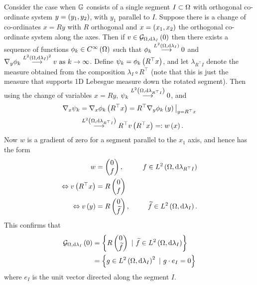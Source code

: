 Consider the case when $\mathbb{G}$ consists of a single segment $I\subset\Omega$ with orthogonal co-ordinate system $y=\left( y_1,y_2 \right)$, with $y_1$ parallel to $I$.
Suppose there is a change of co-ordinates $x=Ry$ with $R$ orthogonal and $x=\left( x_1,x_2 \right)$ the orthogonal co-ordinate system along the axes.
Then if $v\in\mathcal{G}_{ \Omega, \mathrm{d}\lambda_I}\left( 0 \right)$ then there exists a sequence of functions $\phi_k\in C^{\infty}\left( \Omega \right)$ such that $\phi_k\overset{L^{2}\left( \Omega,\mathrm{d}\lambda_I \right)}{\longrightarrow}0$ and $\nabla_y\phi_k\overset{L^{2}\left( \Omega,\mathrm{d}\lambda_I \right)^2}{\longrightarrow} v \ \text{as} \ k \rightarrow\infty$.
Define $\psi_k = \phi_k\left( R^{\top}x \right)$, and let $\lambda_{R^{\top}I}$ denote the measure obtained from the composition $\lambda_I\circ R^{\top}$ (note that this is just the measure that supports 1D Lebesgue measure down the rotated segment).
Then using the change of variables $x=Ry$, $\psi_k\overset{L^{2}\left( \Omega,\mathrm{d}\lambda_{R^{\top}I} \right)}{\longrightarrow}0$, and
\begin{align*}
	\nabla_x\psi_k &= \nabla_x\phi_k\left( R^{\top}x \right) = R^{\top}\nabla_y\phi_k\left( y \right)\big\vert_{y=R^{\top}x} \\
	&\overset{L^{2}\left( \Omega,\mathrm{d}\lambda_{R^{\top}I} \right)}{\longrightarrow} R^{\top}v\left( R^{\top}x \right) =: w\left( x \right).
\end{align*}
Now $w$ is a gradient of zero for a segment parallel to the $x_1$ axis, and hence has the form
\begin{align*}
	w &= \begin{pmatrix} 0 \\ f \end{pmatrix}, &\quad f\in L^{2}\left( \Omega,\mathrm{d}\lambda_{R^{\top}I} \right) \\
	\Leftrightarrow v\left( R^{\top}x \right) &= R\begin{pmatrix} 0 \\ f \end{pmatrix} &\\
	\Leftrightarrow v\left( y \right) &= R\begin{pmatrix} 0 \\ \widetilde{f} \end{pmatrix}, &\quad \widetilde{f}\in L^{2}\left( \Omega,\mathrm{d}\lambda_I \right).
\end{align*}
This confirms that 
\begin{align*}
	\gradZero{\ddom}{\lambda_I} &= \clbracs{R\begin{pmatrix} 0 \\ \widetilde{f} \end{pmatrix} \ \vert \ \widetilde{f}\in\ltwo{\ddom}{\lambda_I}} \\
	&= \clbracs{g\in\ltwo{\ddom}{\lambda_I}^2 \ \vert \ g\cdot e_{I} = 0}
\end{align*}
where $e_I$ is the unit vector directed along the segment $I$.

